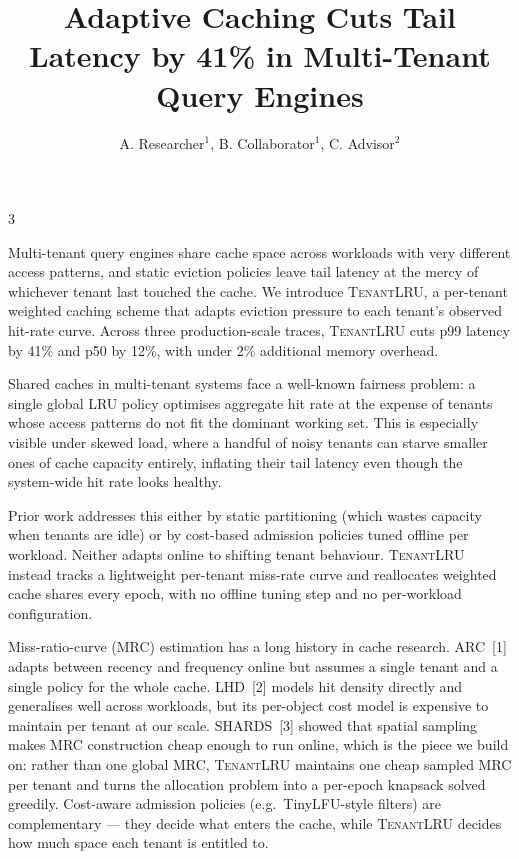 \documentclass[a0,portrait,final]{sciposter}
\title{Adaptive Caching Cuts Tail Latency by 41\% in Multi-Tenant Query Engines}
\author{A. Researcher$^1$, B. Collaborator$^1$, C. Advisor$^2$}
\begin{document}
\maketitle

\begin{multicols}{3}

Multi-tenant query engines share cache space across workloads with very
different access patterns, and static eviction policies leave tail latency
at the mercy of whichever tenant last touched the cache. We introduce
\textsc{TenantLRU}, a per-tenant weighted caching scheme that adapts
eviction pressure to each tenant's observed hit-rate curve. Across three
production-scale traces, \textsc{TenantLRU} cuts p99 latency by 41\% and
p50 by 12\%, with under 2\% additional memory overhead.

Shared caches in multi-tenant systems face a well-known fairness problem:
a single global LRU policy optimises aggregate hit rate at the expense of
tenants whose access patterns do not fit the dominant working set. This is
especially visible under skewed load, where a handful of noisy tenants can
starve smaller ones of cache capacity entirely, inflating their tail
latency even though the system-wide hit rate looks healthy.

Prior work addresses this either by static partitioning (which wastes
capacity when tenants are idle) or by cost-based admission policies tuned
offline per workload. Neither adapts online to shifting tenant behaviour.
\textsc{TenantLRU} instead tracks a lightweight per-tenant miss-rate curve
and reallocates weighted cache shares every epoch, with no offline tuning
step and no per-workload configuration.

Miss-ratio-curve (MRC) estimation has a long history in cache research.
ARC~[1] adapts between recency and frequency online but assumes a
single tenant and a single policy for the whole cache. LHD~[2]
models hit density directly and generalises well across workloads, but its
per-object cost model is expensive to maintain per tenant at our scale.
SHARDS~[3] showed that spatial sampling makes MRC construction
cheap enough to run online, which is the piece we build on: rather than
one global MRC, \textsc{TenantLRU} maintains one cheap sampled MRC per
tenant and turns the allocation problem into a per-epoch knapsack solved
greedily. Cost-aware admission policies (e.g.\ TinyLFU-style filters) are
complementary — they decide what enters the cache, while
\textsc{TenantLRU} decides how much space each tenant is entitled to.


\end{multicols}
\end{document}
